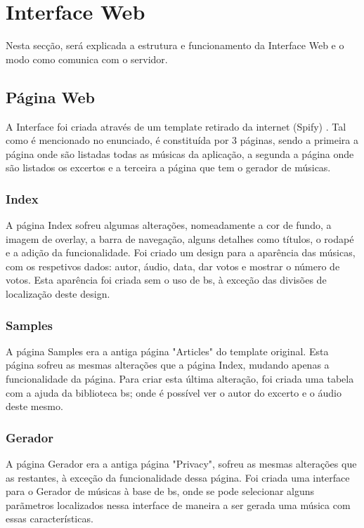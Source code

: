 \documentclass{report}
\begin{document}
\section{Interface Web}
\label{sec:interfaceWeb}
\hspace{5pt}Nesta secção, será explicada a estrutura e funcionamento da Interface Web 
e o modo como comunica com o servidor.

\subsection{Página Web}
\label{ssec:paginaweb}
\hspace{5pt}A Interface  foi criada através de um template retirado da internet (Spify) \cite{spify}. 
Tal como é mencionado no enunciado, é constituída por 3 páginas, sendo a primeira a página 
onde são listadas todas as músicas da aplicação, a segunda a página onde são listados os 
excertos e a terceira a página que tem o gerador de músicas. \cite{icon} \cite{gradientetexto}

\subsubsection{Index}
\label{ssec:Index}
\hspace{5pt}A página Index sofreu algumas alterações, nomeadamente a cor de fundo, a imagem 
de overlay, a barra de navegação, alguns detalhes como títulos, o rodapé e a adição da 
funcionalidade. Foi criado um design para a aparência das músicas, com os respetivos dados: 
autor, áudio, data, dar votos e mostrar o número de votos. Esta aparência foi criada sem o 
uso de \ac{bs}, à exceção das divisões de localização deste design. \cite{icon}

\subsubsection{Samples}
\label{ssec:Samples}
\hspace{5pt}A página Samples era a antiga página "Articles" do template original. Esta página 
sofreu as mesmas alterações que a página Index, mudando apenas a funcionalidade da página. 
Para criar esta última alteração, foi criada uma tabela com a ajuda da biblioteca \ac{bs}; 
onde é possível ver o autor do excerto e o áudio deste mesmo. \cite{volslider} \cite{icon} 
\cite{audioplayer}

\subsubsection{Gerador}
\label{ssec:Gerador}
\hspace{5pt}A página Gerador era a antiga página "Privacy", sofreu as mesmas alterações que 
as restantes, à exceção da funcionalidade dessa página. Foi criada uma interface para o Gerador 
de músicas à base de \ac{bs}, onde se pode selecionar alguns parãmetros localizados nessa 
interface de maneira a ser gerada uma música com essas características. \cite{icon} \cite{audioplayer}
\end{document}
